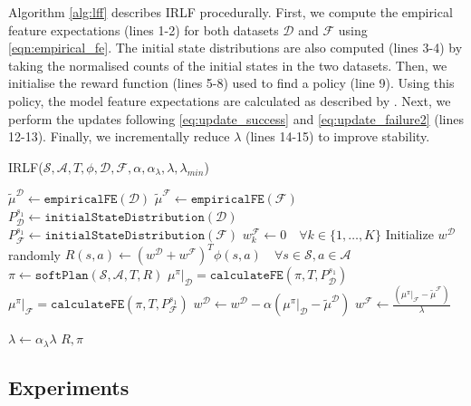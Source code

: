 \documentclass[a4paper,11pt]{report}
\begin{document}
Algorithm \ref{alg:lff} describes IRLF procedurally. First, we compute the empirical feature expectations (lines 1-2) for both datasets $\mathcal{D}$ and $\mathcal{F}$ using \eqref{eqn:empirical_fe}.	The initial state distributions are also computed (lines 3-4) by taking the normalised counts of the initial states in the two datasets. Then, we initialise the reward function (lines 5-8) used to find a policy (line 9). Using this policy, the model feature expectations are calculated as described by \cite{ziebart2013principle}. Next, we perform the updates following \eqref{eq:update_success} and \eqref{eq:update_failure2} (lines 12-13). Finally, we incrementally reduce $\lambda$ (lines 14-15) to improve stability.

\begin{algorithm}
\caption{IRLF($\mathcal{S},\mathcal{A},T, \phi, \mathcal{D}, \mathcal{F}, \alpha, \alpha_{\lambda}, \lambda, \lambda_{min}$) }
\label{alg:lff}
\begin{algorithmic}[1]
\STATE $\widetilde{\mu}^{\mathcal{D}} \gets \mathtt{empiricalFE}(\mathcal{D})$\hfill {}
\STATE $\widetilde{\mu}^{\mathcal{F}} \gets \mathtt{empiricalFE}(\mathcal{F})$ 
\STATE $P_{\mathcal{D}}^{s_1} \gets \mathtt{initialStateDistribution}(\mathcal{D})$
\STATE $P_{\mathcal{F}}^{s_1} \gets \mathtt{initialStateDistribution}(\mathcal{F})$
\STATE $w^{\mathcal{F}}_k\gets 0\quad\forall k\in\{1,\ldots,K\}$
\STATE Initialize $w^{\mathcal{D}}$ randomly
\REPEAT
\STATE $R(s,a) \gets (w^{\mathcal{D}}+w^{\mathcal{F}})^T\phi(s,a)\quad\forall s\in\mathcal{S},a\in\mathcal{A}$
\STATE $\pi \gets \mathtt{softPlan}(\mathcal{S},\mathcal{A},T,R)$\hfill{}
\STATE $\mu^\pi|_{\mathcal{D}} = \mathtt{calculateFE}(\pi,T,P_{\mathcal{D}}^{s_1})$
\STATE $\mu^\pi|_{\mathcal{F}} = \mathtt{calculateFE}(\pi,T,P_{\mathcal{F}}^{s_1})$
\STATE $w^{\mathcal{D}} \leftarrow w^{\mathcal{D}} - \alpha (\mu^\pi|_{\mathcal{D}} - \widetilde{\mu}^{\mathcal{D}})$
\STATE $w^{\mathcal{F}} \leftarrow \frac{(\mu^\pi|_{\mathcal{F}} - \widetilde{\mu}^{\mathcal{F}})}{\lambda}$

\STATE $\lambda \leftarrow \alpha_{\lambda}\lambda$
\ENDIF
{}
\RETURN $R,\pi$
\end{algorithmic}
\end{algorithm}

\vspace{-4mm}

\subsection{Experiments}
\end{document}
